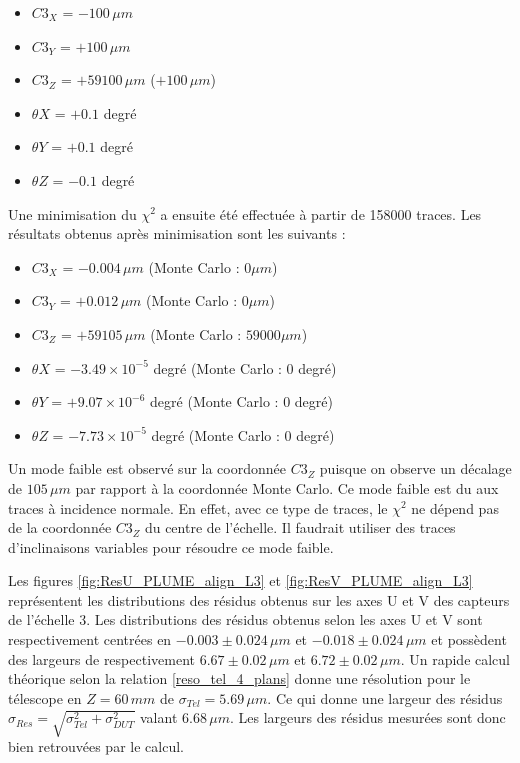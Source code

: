    \medskip
   
   \renewcommand{\labelitemi}{$\bullet$}
  
  \begin{itemize}
   \item $C3_X$ = $-100 \, \mu m$
   \item $C3_Y$ = $+100 \, \mu m$
   \item $C3_Z$ = $+59100 \, \mu m$ ($+100 \, \mu m$)
   \item $\theta X$ = $+0.1$ degr\'e
   \item $\theta Y$ = $+0.1$ degr\'e
   \item $\theta Z$ = $-0.1$ degr\'e
  \end{itemize}

  Une minimisation du $\chi^2$ a ensuite \'et\'e effectu\'ee \`a partir de 158000 traces. Les r\'esultats obtenus apr\`es minimisation sont les suivants :
  
  \medskip
   
  \renewcommand{\labelitemi}{$\bullet$}
  
  \begin{itemize}
   \item $C3_X$ = $-0.004 \, \mu m$ (Monte Carlo : $0 \mu m$)
   \item $C3_Y$ = $+0.012 \, \mu m$ (Monte Carlo : $0 \mu m$)
   \item $C3_Z$ = $+59105 \, \mu m$ (Monte Carlo : $59000 \mu m$)
   \item $\theta X$ = $-3.49 \times 10^{-5}$ degr\'e (Monte Carlo : $0$ degr\'e)
   \item $\theta Y$ = $+9.07 \times 10^{-6}$ degr\'e (Monte Carlo : $0$ degr\'e)
   \item $\theta Z$ = $-7.73 \times 10^{-5}$ degr\'e (Monte Carlo : $0$ degr\'e)
  \end{itemize}
  
  \medskip

  Un mode faible est observ\'e sur la coordonn\'ee $C3_Z$ puisque on observe un d\'ecalage de $105 \, \mu m$ par rapport \`a la coordonn\'ee Monte Carlo. Ce mode faible est du aux traces \`a incidence normale. En effet, avec ce type de traces, le $\chi^2$ ne d\'epend pas de la coordonn\'ee $C3_Z$ du centre de l'\'echelle. Il faudrait utiliser des traces d'inclinaisons variables pour r\'esoudre ce mode faible.
  
  \medskip
  
  Les figures \ref{fig:ResU_PLUME_align_L3} et \ref{fig:ResV_PLUME_align_L3} repr\'esentent les distributions des r\'esidus obtenus sur les axes U et V des capteurs de l'\'echelle 3. Les distributions des r\'esidus obtenus selon les axes U et V sont respectivement centr\'ees en $-0.003 \pm 0.024 \, \mu m$ et $-0.018 \pm 0.024 \, \mu m$ et poss\`edent des largeurs de respectivement $6.67 \pm 0.02 \, \mu m$ et $6.72 \pm 0.02 \, \mu m$. Un rapide calcul th\'eorique selon la relation \ref{reso_tel_4_plans} donne une r\'esolution pour le t\'elescope en $Z = 60 \, mm$ de $\sigma_{Tel} = 5.69 \, \mu m$. Ce qui donne une largeur des r\'esidus $\sigma_{Res} = \sqrt{\sigma_{Tel}^2 + \sigma_{DUT}^2}$ valant $6.68 \, \mu m$. Les largeurs des r\'esidus mesur\'ees sont donc bien retrouv\'ees par le calcul.
  
